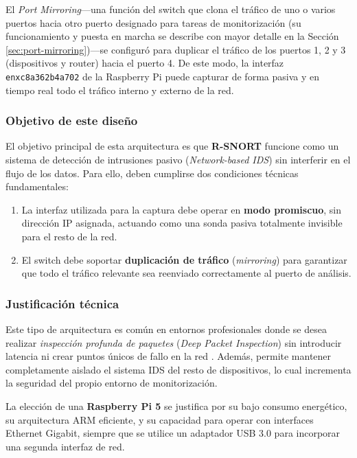 \documentclass[11pt,a4paper,twoside]{report}
\begin{document}
El \textit{Port Mirroring}—una función del switch que clona el tráfico de uno o varios puertos hacia otro puerto designado para tareas de monitorización (su funcionamiento y puesta en marcha se describe con mayor detalle en la Sección \ref{sec:port-mirroring})—se configuró para duplicar el tráfico de los puertos 1, 2 y 3 (dispositivos y router) hacia el puerto 4. De este modo, la interfaz \texttt{enxc8a362b4a702} de la Raspberry Pi puede capturar de forma pasiva y en tiempo real todo el tráfico interno y externo de la red.


\subsubsection{Objetivo de este diseño}

El objetivo principal de esta arquitectura es que \textbf{R-SNORT} funcione como un sistema de detección de intrusiones pasivo (\textit{Network-based IDS}) sin interferir en el flujo de los datos. Para ello, deben cumplirse dos condiciones técnicas fundamentales:

\begin{enumerate}
	\item La interfaz utilizada para la captura debe operar en \textbf{modo promiscuo}, sin dirección IP asignada, actuando como una sonda pasiva totalmente invisible para el resto de la red.
	\item El switch debe soportar \textbf{duplicación de tráfico} (\textit{mirroring}) para garantizar que todo el tráfico relevante sea reenviado correctamente al puerto de análisis.
\end{enumerate}

\subsubsection{Justificación técnica}

Este tipo de arquitectura es común en entornos profesionales donde se desea realizar \textit{inspección profunda de paquetes} (\textit{Deep Packet Inspection}) sin introducir latencia ni crear puntos únicos de fallo en la red \cite{song2020dpi}. Además, permite mantener completamente aislado el sistema IDS del resto de dispositivos, lo cual incrementa la seguridad del propio entorno de monitorización.\newline

La elección de una \textbf{Raspberry Pi 5} se justifica por su bajo consumo energético, su arquitectura ARM eficiente, y su capacidad para operar con interfaces Ethernet Gigabit, siempre que se utilice un adaptador USB 3.0 para incorporar una segunda interfaz de red.
\end{document}
